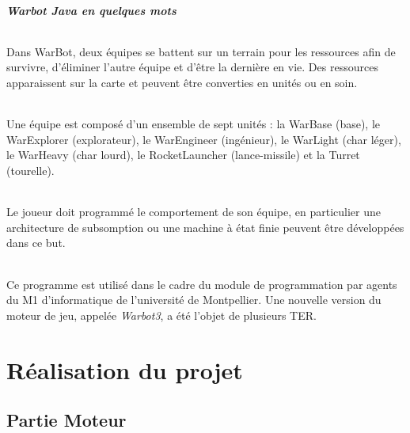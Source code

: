 \documentclass{report}
\begin{document}
\subsubsection{Warbot Java en quelques mots}
\paragraph{}Dans WarBot, deux équipes se battent sur un terrain pour les ressources afin de survivre, d'éliminer l'autre équipe et d’être la dernière en vie. Des ressources apparaissent sur la carte et peuvent être converties en unités ou en soin.
\paragraph{}Une équipe est composé d'un ensemble de sept unités :  la WarBase (base), le WarExplorer (explorateur), le WarEngineer (ingénieur), le WarLight (char léger), le WarHeavy (char lourd), le RocketLauncher (lance-missile) et la Turret (tourelle). 
\paragraph{}Le joueur doit programmé le comportement de son équipe, en particulier une architecture de subsomption ou une machine à état finie peuvent être développées dans ce but. 
\paragraph{}Ce programme est utilisé dans le cadre du module de programmation par agents du M1 d'informatique de l'université de Montpellier. Une nouvelle version du moteur de jeu, appelée \textit{Warbot3}, a été l'objet de plusieurs TER.



\newpage
\part{Réalisation du projet}
\newpage

\chapter{Partie Moteur}
\end{document}
